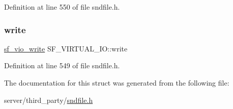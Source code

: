 Definition at line 550 of file sndfile.\+h.

\mbox{\label{struct_s_f___v_i_r_t_u_a_l___i_o_ac99aed00fed47ac8817332e208a8cb4a}} 
\subsubsection{\texorpdfstring{write}{write}}
{\footnotesize\ttfamily \mbox{\hyperlink{sndfile_8h_aa1b1f82878422da550bfd70f2be3ded3}{sf\+\_\+vio\+\_\+write}} S\+F\+\_\+\+V\+I\+R\+T\+U\+A\+L\+\_\+\+I\+O\+::write}



Definition at line 549 of file sndfile.\+h.



The documentation for this struct was generated from the following file\+:\begin{DoxyCompactItemize}
\item 
server/third\+\_\+party/\mbox{\hyperlink{sndfile_8h}{sndfile.\+h}}\end{DoxyCompactItemize}
